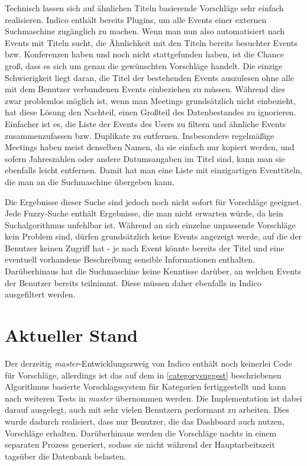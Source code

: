 Technisch lassen sich auf ähnlichen Titeln basierende Vorschläge sehr einfach realisieren. Indico
enthält bereits Plugins, um alle Events einer externen Suchmaschine zugänglich zu machen. Wenn man
nun also automatisiert nach Events mit Titeln sucht, die Ähnlichkeit mit den Titeln bereits
besuchter Events bzw. Konferenzen haben und noch nicht stattgefunden haben, ist die Chance groß,
dass es sich um genau die gewünschten Vorschläge handelt. Die einzige Schwierigkeit liegt daran, die
Titel der bestehenden Events auszulesen ohne alle mit dem Benutzer verbundenen Events einbeziehen zu
müssen. Während dies zwar problemlos möglich ist, wenn man Meetings grundsätzlich nicht einbezieht,
hat diese Lösung den Nachteil, einen Großteil des Datenbestandes zu ignorieren. Einfacher ist es,
die Liste der Events des Users zu filtern und ähnliche Events zusammenzufassen bzw. Duplikate zu
entfernen. Insbesondere regelmäßige Meetings haben meist denselben Namen, da sie einfach nur kopiert
werden, und sofern Jahreszahlen oder andere Datumsangaben im Titel sind, kann man sie ebenfalls
leicht entfernen. Damit hat man eine Liste mit einzigartigen Eventtiteln, die man an die
Suchmaschine übergeben kann.

Die Ergebnisse dieser Suche sind jedoch noch nicht sofort für Vorschläge geeignet. Jede Fuzzy-Suche
enthält Ergebnisse, die man nicht erwarten würde, da kein Suchalgorithmus unfehlbar ist. Während an
sich einzelne unpassende Vorschläge kein Problem sind, dürfen grundsätzlich keine Events angezeigt
werde, auf die der Benutzer keinen Zugriff hat - je nach Event könnte bereits der Titel und eine
eventuell vorhandene Beschreibung sensible Informationen enthalten. Darüberhinaus hat die
Suchmaschine keine Kenntisse darüber, an welchen Events der Benutzer bereits teilnimmt. Diese
müssen daher ebenfalls in Indico ausgefiltert werden.

\section{Aktueller Stand}

Der derzeitig \emph{master}-Entwicklungszweig von Indico enthält noch keinerlei Code für Vorschläge,
allerdings ist das auf dem in \autoref{categorysuggest} beschriebenen Algorithmus basierte
Vorschlagssystem für Kategorien fertiggestellt und kann nach weiteren Tests in \emph{master}
übernommen werden. Die Implementation ist dabei darauf ausgelegt, auch mit sehr vielen Benutzern
performant zu arbeiten.  Dies wurde dadurch realisiert, dass nur Benutzer, die das Dashboard auch
nutzen, Vorschläge erhalten. Darüberhinaus werden die Vorschläge nachts in einem separaten Prozess
generiert, sodass sie nicht während der Hauptarbeitszeit tagsüber die Datenbank belasten.

